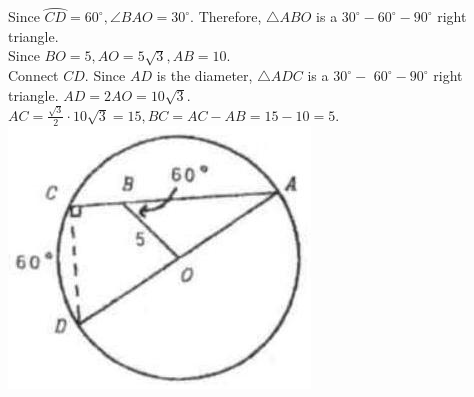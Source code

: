 \documentclass{article}
\begin{document}
Since \(\wideparen{C D}=60^{\circ}, \angle B A O=30^{\circ}\). Therefore, \(\triangle A B O\) is a \(30^{\circ}-60^{\circ}-90^{\circ}\) right triangle.\\
Since \(B O=5, A O=5 \sqrt{3}, A B=10\).\\
Connect \(C D\). Since \(A D\) is the diameter, \(\triangle A D C\) is a \(30^{\circ}-\) \(60^{\circ}-90^{\circ}\) right triangle. \(A D=2 A O=10 \sqrt{3}\).\\
\(A C=\frac{\sqrt{3}}{2} \cdot 10 \sqrt{3}=15, B C=A C-A B=15-10=5\).\\
\centering
\includegraphics[width=\textwidth]{images/reasoning_image_1.jpg}
\end{document}
